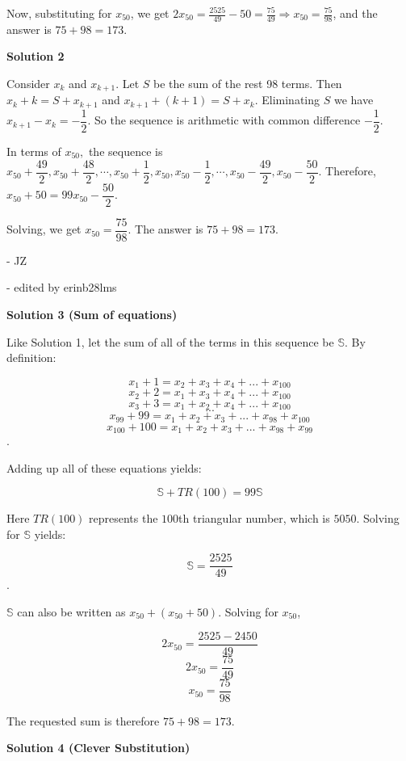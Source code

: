 \begin{enumerate}
 Now, substituting for $x_{50}$, we get $2x_{50}=\frac{2525}{49}-50=\frac{75}{49} \Longrightarrow x_{50}=\frac{75}{98}$, and the answer is $75+98=\boxed{173}$.

 



\textbf{Solution 2}

Consider $x_k$ and $x_{k+1}$. Let $S$ be the sum of the rest 98 terms. Then $x_k+k=S+x_{k+1}$ and $x_{k+1}+(k+1)=S+x_k.$ Eliminating $S$ we have $x_{k+1}-x_k=-\dfrac{1}{2}.$ So the sequence is arithmetic with common difference $-\dfrac{1}{2}.$ 

 In terms of $x_{50},$ the sequence is $x_{50}+\dfrac{49}{2}, x_{50}+\dfrac{48}{2},\cdots,x_{50}+\dfrac{1}{2}, x_{50}, x_{50}-\dfrac{1}{2}, \cdots, x_{50}-\dfrac{49}{2}, x_{50}-\dfrac{50}{2}.$ Therefore, $x_{50}+50=99x_{50}-\dfrac{50}{2}$.

 Solving, we get $x_{50}=\dfrac{75}{98}.$ The answer is $75+98=\boxed{173}.$

 - JZ

 - edited by erinb28lms

 



\textbf{Solution 3 (Sum of equations)}

Like Solution 1, let the sum of all of the terms in this sequence be $\mathbb{S}$. By definition:

 
 \[x_1 + 1 = x_2+x_3+x_4+...+x_{100}\]
 \[x_2 + 2 = x_1+x_3+x_4+...+x_{100}\]
 \[x_3 + 3 = x_1+x_2+x_4+...+x_{100}\]
 \[...\]
 \[x_{99} + 99 = x_1+x_2+x_3+...+x_{98}+x_{100}\]
 \[x_{100} + 100 = x_1+x_2+x_3+...+x_{98}+x_{99}\].

 Adding up all of these equations yields:

 
 \[\mathbb{S} + TR(100) = 99\mathbb{S}\]

 Here $TR(100)$ represents the $100$th triangular number, which is $5050$. Solving for $\mathbb{S}$ yields:

 
 \[\mathbb{S} = \frac{2525}{49}\].

 $\mathbb{S}$ can also be written as $x_{50} + (x_{50} + 50)$. Solving for $x_{50}$,

 
 \[2x_{50} = \frac{2525-2450}{49}\]
 \[2x_{50} = \frac{75}{49}\]
 \[x_{50} = \frac{75}{98}\]

 The requested sum is therefore $75+98 = \boxed{173}$.

 



\textbf{Solution 4 (Clever Substitution)}


\end{enumerate}
